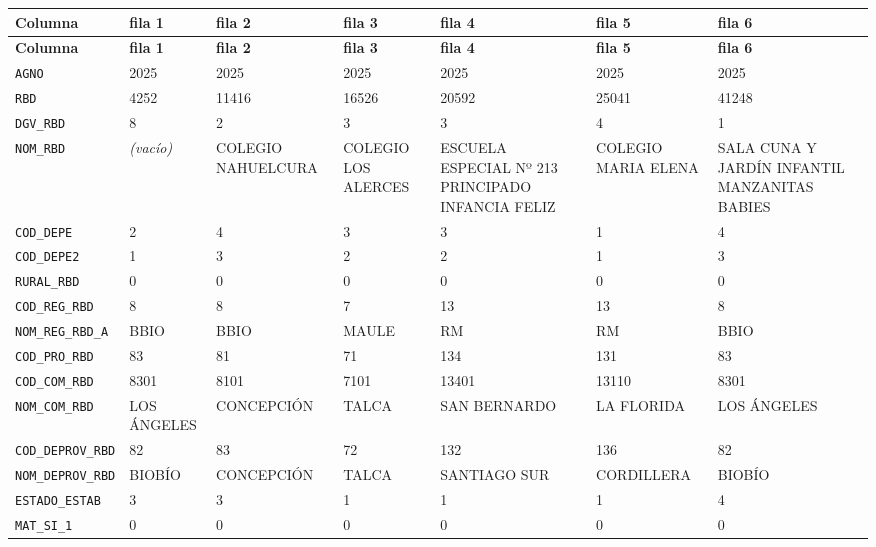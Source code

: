 \documentclass[10pt]{article}
\newcommand{\hdr}[1]{\textbf{\color{white}#1}}
\begin{document}
\footnotesize
\begin{xltabular}{\linewidth}{@{}p{4.3cm} Y Y Y Y Y Y @{}}
\hdr{Columna} & \hdr{fila 1} & \hdr{fila 2} & \hdr{fila 3} & \hdr{fila 4} & \hdr{fila 5} & \hdr{fila 6} \\
\endfirsthead
{}\hdr{Columna} & \hdr{fila 1} & \hdr{fila 2} & \hdr{fila 3} & \hdr{fila 4} & \hdr{fila 5} & \hdr{fila 6} \\
\endhead
{}\texttt{AGNO} & 2025 & 2025 & 2025 & 2025 & 2025 & 2025 \\
\texttt{RBD} & 4252 & 11416 & 16526 & 20592 & 25041 & 41248 \\
\texttt{DGV\_\allowbreak{}RBD} & 8 & 2 & 3 & 3 & 4 & 1 \\
\texttt{NOM\_\allowbreak{}RBD} & \textit{\color{gris}(vacío)} & COLEGIO NAHUELCURA & COLEGIO LOS ALERCES & ESCUELA ESPECIAL Nº 213 PRINCIPADO INFANCIA FELIZ & COLEGIO MARIA ELENA & SALA CUNA Y JARDÍN INFANTIL MANZANITAS BABIES \\
\texttt{COD\_\allowbreak{}DEPE} & 2 & 4 & 3 & 3 & 1 & 4 \\
\texttt{COD\_\allowbreak{}DEPE2} & 1 & 3 & 2 & 2 & 1 & 3 \\
\texttt{RURAL\_\allowbreak{}RBD} & 0 & 0 & 0 & 0 & 0 & 0 \\
\texttt{COD\_\allowbreak{}REG\_\allowbreak{}RBD} & 8 & 8 & 7 & 13 & 13 & 8 \\
\texttt{NOM\_\allowbreak{}REG\_\allowbreak{}RBD\_\allowbreak{}A} & BBIO & BBIO & MAULE & RM & RM & BBIO \\
\texttt{COD\_\allowbreak{}PRO\_\allowbreak{}RBD} & 83 & 81 & 71 & 134 & 131 & 83 \\
\texttt{COD\_\allowbreak{}COM\_\allowbreak{}RBD} & 8301 & 8101 & 7101 & 13401 & 13110 & 8301 \\
\texttt{NOM\_\allowbreak{}COM\_\allowbreak{}RBD} & LOS ÁNGELES & CONCEPCIÓN & TALCA & SAN BERNARDO & LA FLORIDA & LOS ÁNGELES \\
\texttt{COD\_\allowbreak{}DEPROV\_\allowbreak{}RBD} & 82 & 83 & 72 & 132 & 136 & 82 \\
\texttt{NOM\_\allowbreak{}DEPROV\_\allowbreak{}RBD} & BIOBÍO & CONCEPCIÓN & TALCA & SANTIAGO SUR & CORDILLERA & BIOBÍO \\
\texttt{ESTADO\_\allowbreak{}ESTAB} & 3 & 3 & 1 & 1 & 1 & 4 \\
\texttt{MAT\_\allowbreak{}SI\_\allowbreak{}1} & 0 & 0 & 0 & 0 & 0 & 0 \\

\end{xltabular}
\end{document}
